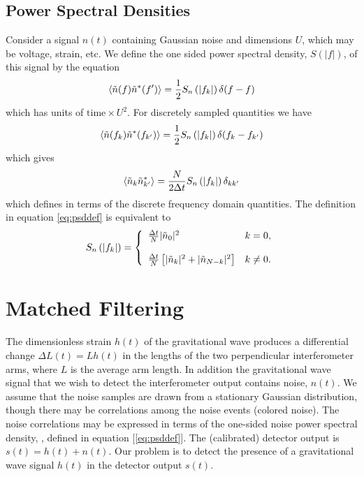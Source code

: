 \subsection{Power Spectral Densities}
\label{ss:psdconv}

Consider a signal $n(t)$ containing Gaussian noise and dimensions $U$, which
may be voltage, strain, etc. We define the one sided power spectral density,
$S(|f|)$, of this signal by the equation
\begin{equation}
\left\langle\tilde{n}(f) \tilde{n}^\ast(f')\right\rangle = 
\frac{1}{2}S_n\left(\left|f_{k}\right|\right)\delta(f-f)
\end{equation}
which has units of $\mathrm{time}\times U^2$. For discretely sampled 
quantities we have
\begin{equation}
\left\langle\tilde{n}(f_k) \tilde{n}^\ast(f_{k'})\right\rangle = 
\frac{1}{2}S_n\left(\left|f_{k}\right|\right)\delta(f_k-f_{k'})
\end{equation}
which gives
\begin{equation}
\label{eq:psddef}
\left\langle\tilde{n}_k \tilde{n}_{k'}^\ast\right\rangle = 
\frac{N}{2\Delta t}S_n\left(\left|f_{k}\right|\right)\delta_{kk'}
\end{equation}
which defines \ospsd in terms of the discrete frequency domain quantities.
The definition in equation \ref{eq:psddef} is equivalent to
\begin{equation}
S_n\left(\left|f_{k}\right|\right) = \left\{
\begin{array}{ll}
\frac{\Delta t}{N} | \tilde{n}_0 |^2 & k = 0, \\
\\
\frac{\Delta t}{N} \left[ | \tilde{n}_k |^2 + | \tilde{n}_{N-k} |^2 \right] &
k\neq 0.
\end{array}
\right.
\end{equation}

\section{Matched Filtering}
\label{s:matchedfilter}

The dimensionless strain $h(t)$ of the gravitational wave produces a
differential change $\Delta L(t)=L h(t)$ in the lengths of the two
perpendicular interferometer arms, where $L$ is the average arm length.  In
addition the gravitational wave signal that we wish to detect the
interferometer output contains noise, $n(t)$. We assume that the noise samples
are drawn from a stationary Gaussian distribution, though there may be
correlations among the noise events (colored noise). The noise correlations
may be expressed in terms of the one-sided noise power spectral density,
\ospsd, defined in equation [\ref{eq:psddef}]. The (calibrated) detector
output is $s(t) = h(t) + n(t)$.  Our problem is to detect the presence of a
gravitational wave signal $h(t)$ in the detector output $s(t)$.

